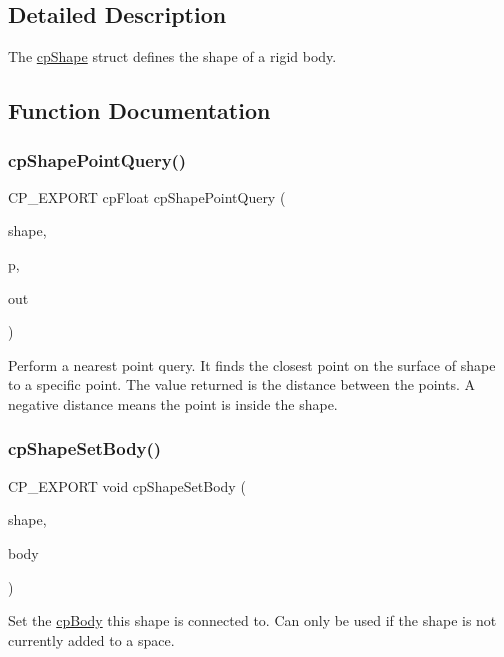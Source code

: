 \subsection{Detailed Description}
The \hyperlink{structcpShape}{cp\+Shape} struct defines the shape of a rigid body. 

\subsection{Function Documentation}
\mbox{\label{group__cpShape_ga5b0f787bc6f0d614d4616c08c807cd6c}} 
\subsubsection{\texorpdfstring{cp\+Shape\+Point\+Query()}{cpShapePointQuery()}}
{\footnotesize\ttfamily C\+P\+\_\+\+E\+X\+P\+O\+RT cp\+Float cp\+Shape\+Point\+Query (\begin{DoxyParamCaption}\item[{const \hyperlink{structcpShape}{cp\+Shape} $\ast$}]{shape,  }\item[{\hyperlink{structcpVect}{cp\+Vect}}]{p,  }\item[{\hyperlink{structcpPointQueryInfo}{cp\+Point\+Query\+Info} $\ast$}]{out }\end{DoxyParamCaption})}

Perform a nearest point query. It finds the closest point on the surface of shape to a specific point. The value returned is the distance between the points. A negative distance means the point is inside the shape. \mbox{\label{group__cpShape_ga222501265d75e838459285452a92d6f5}} 
\subsubsection{\texorpdfstring{cp\+Shape\+Set\+Body()}{cpShapeSetBody()}}
{\footnotesize\ttfamily C\+P\+\_\+\+E\+X\+P\+O\+RT void cp\+Shape\+Set\+Body (\begin{DoxyParamCaption}\item[{\hyperlink{structcpShape}{cp\+Shape} $\ast$}]{shape,  }\item[{\hyperlink{structcpBody}{cp\+Body} $\ast$}]{body }\end{DoxyParamCaption})}

Set the \hyperlink{structcpBody}{cp\+Body} this shape is connected to. Can only be used if the shape is not currently added to a space. 